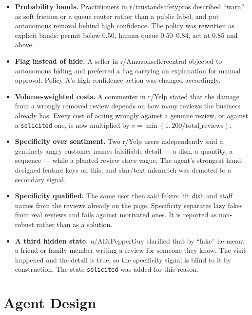 \documentclass{article}
\begin{document}
\begin{itemize}
    \item \textbf{Probability bands.} Practitioners in r/trustandsafetypros
          described ``warn'' as soft friction or a queue router rather than a
          public label, and put autonomous removal behind high confidence. The
          policy was rewritten as explicit bands: permit below 0.50, human
          queue 0.50--0.84, act at 0.85 and above.
    \item \textbf{Flag instead of hide.} A seller in r/Amazonsellercentral
          objected to autonomous hiding and preferred a flag carrying an
          explanation for manual approval. Policy A's high-confidence action
          was changed accordingly.
    \item \textbf{Volume-weighted costs.} A commenter in r/Yelp stated that the
          damage from a wrongly removed review depends on how many reviews the
          business already has. Every cost of acting wrongly against a genuine
          review, or against a \texttt{solicited} one, is now multiplied by
          $v = \min(1, 200/\text{total\_reviews})$.
    \item \textbf{Specificity over sentiment.} Two r/Yelp users independently
          said a genuinely angry customer names falsifiable detail --- a dish,
          a quantity, a sequence --- while a planted review stays vague. The
          agent's strongest hand-designed feature keys on this, and star/text
          mismatch was demoted to a secondary signal.
    \item \textbf{Specificity qualified.} The same user then said fakers lift
          dish and staff names from the reviews already on the page.
          Specificity separates lazy fakes from real reviews and fails against
          motivated ones. It is reported as non-robust rather than as a
          solution.
    \item \textbf{A third hidden state.} u/ADrPepperGuy clarified that by
          ``fake'' he meant a friend or family member writing a review for
          someone they know. The visit happened and the detail is true, so the
          specificity signal is blind to it by construction. The state
          \texttt{solicited} was added for this reason.
\end{itemize}

\section{Agent Design}
\end{document}
